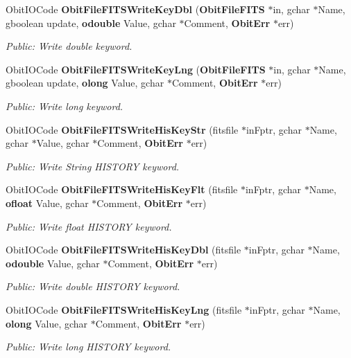 \begin{CompactItemize}
Obit\-IOCode {\bf Obit\-File\-FITSWrite\-Key\-Dbl} ({\bf Obit\-File\-FITS} $\ast$in, gchar $\ast$Name, gboolean update, {\bf odouble} Value, gchar $\ast$Comment, {\bf Obit\-Err} $\ast$err)
\begin{CompactList}\small\item\em Public: Write double keyword. \item\end{CompactList}\item 
Obit\-IOCode {\bf Obit\-File\-FITSWrite\-Key\-Lng} ({\bf Obit\-File\-FITS} $\ast$in, gchar $\ast$Name, gboolean update, {\bf olong} Value, gchar $\ast$Comment, {\bf Obit\-Err} $\ast$err)
\begin{CompactList}\small\item\em Public: Write long keyword. \item\end{CompactList}\item 
Obit\-IOCode {\bf Obit\-File\-FITSWrite\-His\-Key\-Str} (fitsfile $\ast$in\-Fptr, gchar $\ast$Name, gchar $\ast$Value, gchar $\ast$Comment, {\bf Obit\-Err} $\ast$err)
\begin{CompactList}\small\item\em Public: Write String HISTORY keyword. \item\end{CompactList}\item 
Obit\-IOCode {\bf Obit\-File\-FITSWrite\-His\-Key\-Flt} (fitsfile $\ast$in\-Fptr, gchar $\ast$Name, {\bf ofloat} Value, gchar $\ast$Comment, {\bf Obit\-Err} $\ast$err)
\begin{CompactList}\small\item\em Public: Write float HISTORY keyword. \item\end{CompactList}\item 
Obit\-IOCode {\bf Obit\-File\-FITSWrite\-His\-Key\-Dbl} (fitsfile $\ast$in\-Fptr, gchar $\ast$Name, {\bf odouble} Value, gchar $\ast$Comment, {\bf Obit\-Err} $\ast$err)
\begin{CompactList}\small\item\em Public: Write double HISTORY keyword. \item\end{CompactList}\item 
Obit\-IOCode {\bf Obit\-File\-FITSWrite\-His\-Key\-Lng} (fitsfile $\ast$in\-Fptr, gchar $\ast$Name, {\bf olong} Value, gchar $\ast$Comment, {\bf Obit\-Err} $\ast$err)
\begin{CompactList}\small\item\em Public: Write long HISTORY keyword. \item\end{CompactList}\item 

\end{CompactItemize}
